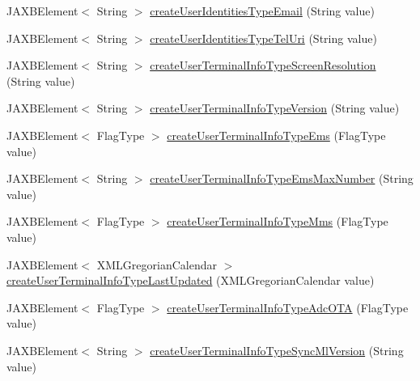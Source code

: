 \begin{DoxyCompactItemize}
\item 
JAXBElement$<$ String $>$ \hyperlink{classcom_1_1telefonica_1_1schemas_1_1unica_1_1rest_1_1directory_1_1v1_1_1ObjectFactory_a399f18868c529c8d408937e76864e39b}{createUserIdentitiesTypeEmail} (String value)
\item 
JAXBElement$<$ String $>$ \hyperlink{classcom_1_1telefonica_1_1schemas_1_1unica_1_1rest_1_1directory_1_1v1_1_1ObjectFactory_a9a5a163d5aa758b100f675aadd2fa6fb}{createUserIdentitiesTypeTelUri} (String value)
\item 
JAXBElement$<$ String $>$ \hyperlink{classcom_1_1telefonica_1_1schemas_1_1unica_1_1rest_1_1directory_1_1v1_1_1ObjectFactory_aea7624669dd1044ba6b0c90c0105b789}{createUserTerminalInfoTypeScreenResolution} (String value)
\item 
JAXBElement$<$ String $>$ \hyperlink{classcom_1_1telefonica_1_1schemas_1_1unica_1_1rest_1_1directory_1_1v1_1_1ObjectFactory_a1268a5c5ed666f9f3330655216309875}{createUserTerminalInfoTypeVersion} (String value)
\item 
JAXBElement$<$ FlagType $>$ \hyperlink{classcom_1_1telefonica_1_1schemas_1_1unica_1_1rest_1_1directory_1_1v1_1_1ObjectFactory_a5bfaec6baf1f50a691611680b439addb}{createUserTerminalInfoTypeEms} (FlagType value)
\item 
JAXBElement$<$ String $>$ \hyperlink{classcom_1_1telefonica_1_1schemas_1_1unica_1_1rest_1_1directory_1_1v1_1_1ObjectFactory_a2de22bc35ceae50f66d9e3d957413c5b}{createUserTerminalInfoTypeEmsMaxNumber} (String value)
\item 
JAXBElement$<$ FlagType $>$ \hyperlink{classcom_1_1telefonica_1_1schemas_1_1unica_1_1rest_1_1directory_1_1v1_1_1ObjectFactory_a179bc81fa02c1f5f015cde1bd244bc26}{createUserTerminalInfoTypeMms} (FlagType value)
\item 
JAXBElement$<$ XMLGregorianCalendar $>$ \hyperlink{classcom_1_1telefonica_1_1schemas_1_1unica_1_1rest_1_1directory_1_1v1_1_1ObjectFactory_a8e889e4ee8ced3d250f15cd2a847990d}{createUserTerminalInfoTypeLastUpdated} (XMLGregorianCalendar value)
\item 
JAXBElement$<$ FlagType $>$ \hyperlink{classcom_1_1telefonica_1_1schemas_1_1unica_1_1rest_1_1directory_1_1v1_1_1ObjectFactory_a153fcff9508b48ad9061ea9f0ce0d53e}{createUserTerminalInfoTypeAdcOTA} (FlagType value)
\item 
JAXBElement$<$ String $>$ \hyperlink{classcom_1_1telefonica_1_1schemas_1_1unica_1_1rest_1_1directory_1_1v1_1_1ObjectFactory_ab2ab3f5a362f903db1d462ee49b508d4}{createUserTerminalInfoTypeSyncMlVersion} (String value)

\end{DoxyCompactItemize}
